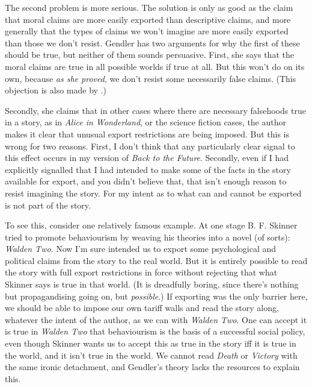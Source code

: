 The second problem is more serious. The solution is only as good as the claim that moral claims are more easily exported than descriptive claims, and more generally that the types of claims we won't imagine are more easily exported than those we don't resist. Gendler has two arguments for why the first of these should be true, but neither of them sounds persuasive. First, she says that the moral claims are true in all possible worlds if true at all. But this won't do on its own, because \textit{as she proved}, we don't resist some necessarily false claims. (This objection is also made by \cite[94]{Matravers2003}.)

Secondly, she claims that in other cases where there are necessary falsehoods true in a story, as in \textit{Alice in Wonderland}, or the science fiction cases, the author makes it clear that unusual export restrictions are being imposed. But this is wrong for two reasons. First, I don't think that any particularly clear signal to this effect occurs in my version of \textit{Back to the Future}. Secondly, even if I had explicitly signalled that I had intended to make some of the facts in the story available for export, and you didn't believe that, that isn't enough reason to resist imagining the story. For my intent as to what can and cannot be exported is not part of the story. 

To see this, consider one relatively famous example. At one stage B. F. Skinner tried to promote behaviourism by weaving his theories into a novel (of sorts): \textit{Walden Two}. Now I'm sure \citeauthor{Skinner1948} intended us to export some psychological and political claims from the story to the real world. But it is entirely possible to read the story with full export restrictions in force without rejecting that what Skinner says is true in that world. (It is dreadfully boring, since there's nothing but propagandising going on, but \textit{possible}.) If exporting was the only barrier here, we should be able to impose our own tariff walls and read the story along, whatever the intent of the author, as we can with \textit{Walden Two}. One can accept it is true in \textit{Walden Two} that behaviourism is the basis of a successful social policy, even though Skinner wants us to accept this as true in the story iff it is true in the world, and it isn't true in the world. We cannot read \textit{Death} or \textit{Victory} with the same ironic detachment, and Gendler's theory lacks the resources to explain this.

